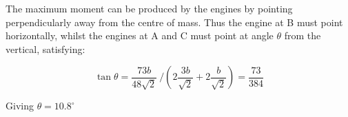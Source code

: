 \begin{problem}
{\begin{enumerate}
	The maximum moment can be produced by the engines by pointing perpendicularly away from the centre of mass. Thus the engine at B must point horizontally, whilst the engines at A and C must point at angle $\theta$ from the vertical, satisfying:
	
	\begin{equation} \tan{\theta} = \frac{73b}{48\sqrt{2}}~ \Big/ \left(2 \frac{3b}{\sqrt{2}} + 2 \frac{b}{\sqrt{2}}  \right) = \frac{73}{384} \end{equation}
	
	Giving $\theta = 10.8^{\circ}$
	
	
	


\end{enumerate}
}
\end{problem}